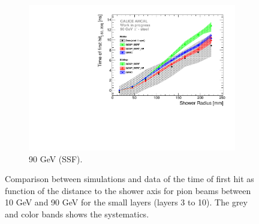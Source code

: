 \begin{figure}[htbp!]
\begin{subfigure}[t]{0.5\textwidth}
		\includegraphics[width=1\textwidth]{../Thesis_Plots/Timing/Pions/Plots/ComparisonToSim/Time_Radius_90GeV_SSF.pdf}
		\caption{90 GeV (SSF).} \label{fig:Radius_SSF_SimData_90GeV}
	\end{subfigure}
	\caption{Comparison between simulations and data of the time of first hit as function of the distance to the shower axis for pion beams between 10 GeV and 90 GeV for the small layers (layers 3 to 10). The grey and color bands shows the systematics.}
	\label{fig:Radius_SSF_SimData_Comparison}
\end{figure}

